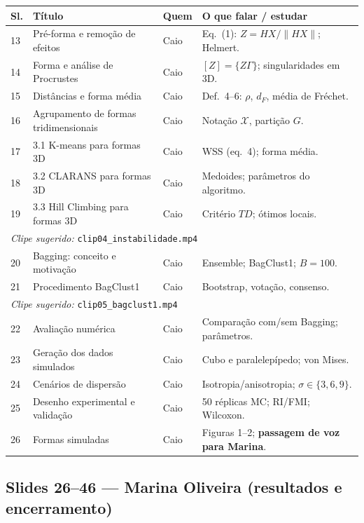 \documentclass[12pt,a4paper]{article}
\begin{document}
\begin{longtable}{@{}p{1.1cm}p{5.2cm}p{2cm}p{5.9cm}@{}}
\toprule
\textbf{Sl.} & \textbf{Título} & \textbf{Quem} & \textbf{O que falar / estudar} \\
\midrule
\endhead
13 & Pré-forma e remoção de efeitos & Caio & Eq.~(1): $Z = HX/\|HX\|$; Helmert. \\
14 & Forma e análise de Procrustes & Caio & $[Z] = \{Z\Gamma\}$; singularidades em 3D. \\
15 & Distâncias e forma média & Caio & Def.~4--6: $\rho$, $d_F$, média de Fréchet. \\
16 & Agrupamento de formas tridimensionais & Caio & Notação $\mathcal{X}$, partição $G$. \\
17 & 3.1 K-means para formas 3D & Caio & WSS (eq.~4); forma média. \\
18 & 3.2 CLARANS para formas 3D & Caio & Medoides; parâmetros do algoritmo. \\
19 & 3.3 Hill Climbing para formas 3D & Caio & Critério $TD$; ótimos locais. \\
\midrule
\multicolumn{4}{l}{\textit{Clipe sugerido:} \texttt{clip04\_instabilidade.mp4}} \\
\midrule
20 & Bagging: conceito e motivação & Caio & Ensemble; BagClust1; $B=100$. \\
21 & Procedimento BagClust1 & Caio & Bootstrap, votação, consenso. \\
\midrule
\multicolumn{4}{l}{\textit{Clipe sugerido:} \texttt{clip05\_bagclust1.mp4}} \\
\midrule
22 & Avaliação numérica & Caio & Comparação com/sem Bagging; parâmetros. \\
23 & Geração dos dados simulados & Caio & Cubo e paralelepípedo; von Mises. \\
24 & Cenários de dispersão & Caio & Isotropia/anisotropia; $\sigma \in \{3,6,9\}$. \\
25 & Desenho experimental e validação & Caio & 50 réplicas MC; RI/FMI; Wilcoxon. \\
26 & Formas simuladas & Caio & Figuras 1--2; \textbf{passagem de voz para Marina}. \\
\bottomrule
\end{longtable}

\subsection{Slides 26--46 --- Marina Oliveira (resultados e encerramento)}
\end{document}
